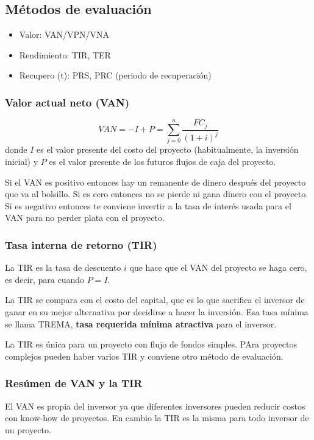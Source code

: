 \documentclass[twocolumn,10pt]{article}
\begin{document}
\subsection{Métodos de evaluación}

\begin{itemize}
	\item Valor: VAN/VPN/VNA
	\item Rendimiento: TIR, TER
	\item Recupero (t): PRS, PRC (periodo de recuperación)
\end{itemize}

\subsubsection{Valor actual neto (VAN)}

\[
	VAN = -I + P = \sum_{j=0}^n \frac{FC_j}{(1+i)^j}
\]
donde $I$ es el valor presente del costo del proyecto (habitualmente, la inversión inicial) y $P$ es el valor presente de los futuros flujos de caja del proyecto.

Si el VAN es positivo entonces hay un remanente de dinero después del proyecto que va al bolsillo. Si es cero entonces no se pierde ni gana dinero con el proyecto. Si es negativo entonces te conviene invertir a la tasa de interés usada para el VAN para no perder plata con el proyecto.

 \subsubsection{Tasa interna de retorno (TIR)}

 La TIR es la tasa de descuento $i$ que hace que el VAN del proyecto se haga cero, es decir, para cuando $P=I$.

 La TIR se compara con el costo del capital, que es lo que sacrifica el inversor de ganar en su mejor alternativa por decidirse a hacer la inversión. Esa tasa mínima se llama TREMA, \textbf{tasa requerida mínima atractiva} para el inversor. 
 
 La TIR es única para un proyecto con flujo de fondos simples. PAra proyectos complejos pueden haber varios TIR y conviene otro método de evaluación.

 \subsubsection{Resúmen de VAN y la TIR}
El VAN es propia del inversor ya que diferentes inversores pueden reducir costos con know-how de proyectos. En cambio la TIR es la misma para todo inversor de un proyecto.
\end{document}
